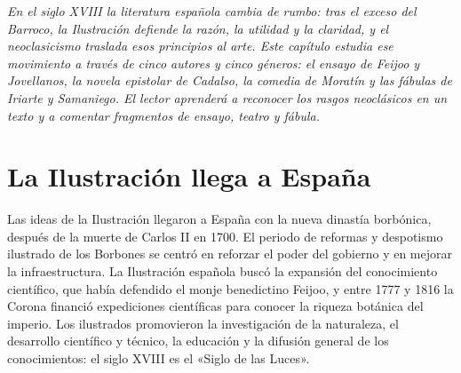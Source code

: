 \documentclass{book}
\begin{document}
\noindent\textit{En el siglo XVIII la literatura española cambia de rumbo: tras el exceso del Barroco, la Ilustración defiende la razón, la utilidad y la claridad, y el neoclasicismo traslada esos principios al arte. Este capítulo estudia ese movimiento a través de cinco autores y cinco géneros: el ensayo de Feijoo y Jovellanos, la novela epistolar de Cadalso, la comedia de Moratín y las fábulas de Iriarte y Samaniego. El lector aprenderá a reconocer los rasgos neoclásicos en un texto y a comentar fragmentos de ensayo, teatro y fábula.}


\section{La Ilustración llega a España}

Las ideas de la Ilustración llegaron a España con la nueva dinastía borbónica, después de la muerte de Carlos II en 1700. El periodo de reformas y despotismo ilustrado de los Borbones se centró en reforzar el poder del gobierno y en mejorar la infraestructura. La Ilustración española buscó la expansión del conocimiento científico, que había defendido el monje benedictino Feijoo, y entre 1777 y 1816 la Corona financió expediciones científicas para conocer la riqueza botánica del imperio. Los ilustrados promovieron la investigación de la naturaleza, el desarrollo científico y técnico, la educación y la difusión general de los conocimientos: el siglo XVIII es el «Siglo de las Luces».

\end{document}
